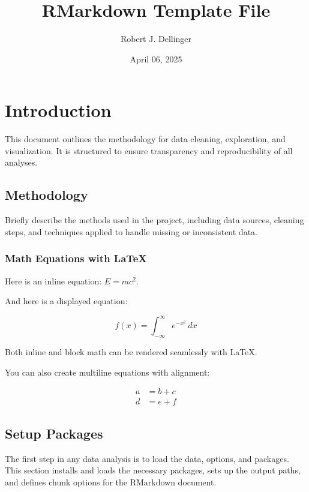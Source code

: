 \documentclass[
  12pt,
]{article}
\title{RMarkdown Template File}
\author{Robert J. Dellinger}
\date{April 06, 2025}
\begin{document}
\maketitle

{
\setcounter{tocdepth}{3}
\tableofcontents
}
\newpage

\section{Introduction}\label{introduction}

This document outlines the methodology for data cleaning, exploration,
and visualization. It is structured to ensure transparency and
reproducibility of all analyses.

\subsection{Methodology}\label{methodology}

Briefly describe the methods used in the project, including data
sources, cleaning steps, and techniques applied to handle missing or
inconsistent data.

\subsubsection{Math Equations with
LaTeX}\label{math-equations-with-latex}

Here is an inline equation: \(E = mc^2\).

And here is a displayed equation:

\[
f(x) = \int_{-\infty}^{\infty} e^{-x^2} \, dx
\]

Both inline and block math can be rendered seamlessly with LaTeX.

You can also create multiline equations with alignment:

\[
\begin{aligned}
a &= b + c \\
d &= e + f
\end{aligned}
\]

\subsection{Setup Packages}\label{setup-packages}

The first step in any data analysis is to load the data, options, and
packages. This section installs and loads the necessary packages, sets
up the output paths, and defines chunk options for the RMarkdown
document.
\end{document}
